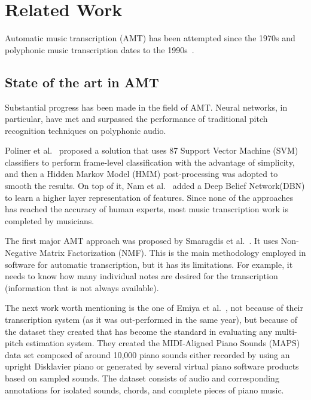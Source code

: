 \newpage
\chapter{Related Work}

Automatic music transcription (AMT) has been attempted since the 1970s and polyphonic music transcription dates to the 1990s~\cite{REF:1}.
\par

\section{State of the art in AMT}

Substantial progress has been made in the field of AMT. Neural networks, in particular, have met and surpassed the performance of traditional pitch recognition techniques on polyphonic audio.
\par

Poliner et al.~\cite{REF:2} proposed a solution that uses 87 Support Vector Machine (SVM) classifiers to perform frame-level classification with the advantage of simplicity, and then a Hidden Markov Model (HMM) post-processing was adopted to smooth the results. On top of it, Nam et al.~\cite{REF:3} added a Deep Belief Network(DBN) to learn a higher layer representation of features. Since none of the approaches has reached the accuracy of human experts, most music transcription work is completed by musicians.
\par

The first major AMT approach was proposed by Smaragdis et al.~\cite{REF:8}. It uses Non-Negative Matrix Factorization (NMF). This is the main methodology employed in software for automatic transcription, but it has its limitations. For example, it needs to know how many individual notes are desired for the transcription (information that is not always available).
\par

The next work worth mentioning is the one of Emiya et al.~\cite{REF:9}, not because of their transcription system (as it was out-performed in the same year), but because of the dataset they created that has become the standard in evaluating any multi-pitch estimation system. They created the MIDI-Aligned Piano Sounds (MAPS) data set composed of around 10,000 piano sounds either recorded by using an upright Disklavier piano or generated by several virtual piano software products based on sampled sounds. The dataset
consists of audio and corresponding annotations for isolated sounds, chords, and complete pieces of piano music.
\par

